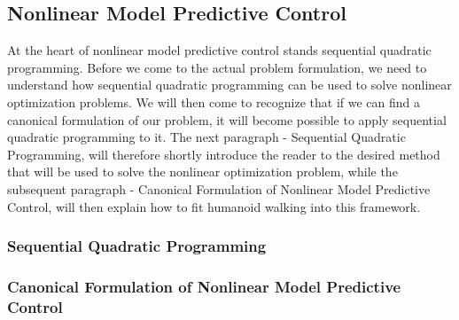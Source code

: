 \subsection{Nonlinear Model Predictive Control}
\label{sec::312_nmpc}
At the heart of nonlinear model predictive control stands sequential quadratic programming. Before we come to the actual problem formulation, we need to understand how sequential quadratic programming can be used to solve nonlinear optimization problems. We will then come to recognize that if we can find a canonical formulation of our problem, it will become possible to apply sequential quadratic programming to it. The next paragraph - Sequential Quadratic Programming, will therefore shortly introduce the reader to the desired method that will be used to solve the  nonlinear optimization problem, while the subsequent paragraph - Canonical Formulation of Nonlinear Model Predictive Control, will then explain how to fit humanoid walking into this framework.
\subsubsection{Sequential Quadratic Programming}
\cite{boggs1995sequential} %
\subsubsection{Canonical Formulation of Nonlinear Model Predictive Control}


\cite{kajita2003biped} %
\cite{herdt2010online} %
\cite{herdt2010walking} %
\cite{naveau2016reactive} %